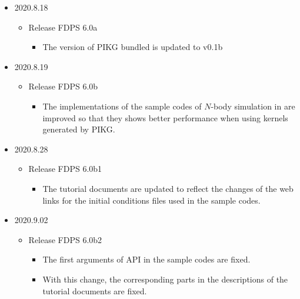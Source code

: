 \begin{itemize}[leftmargin=*,itemsep=-1ex]
\item 2020.8.18
\begin{itemize}
\item Release FDPS 6.0a
\begin{itemize}
\item The version of PIKG bundled is updated to v0.1b
\end{itemize}
\end{itemize}

\item 2020.8.19
\begin{itemize}
\item Release FDPS 6.0b
\begin{itemize}
\item The implementations of the sample codes of $N$-body simulation in  are improved so that they shows better performance when using kernels generated by PIKG.
\end{itemize}
\end{itemize}
    
\item 2020.8.28
\begin{itemize}
\item Release FDPS 6.0b1
\begin{itemize}
\item The tutorial documents are updated to reflect the changes of the web links for the initial conditions files used in the sample codes.
\end{itemize}
\end{itemize}

\item 2020.9.02
\begin{itemize}
\item Release FDPS 6.0b2
\begin{itemize}
\item The first arguments of API  in the sample codes are fixed.
\item With this change, the corresponding parts in the descriptions of the tutorial documents are fixed.
\end{itemize}
\end{itemize}


\end{itemize} 
